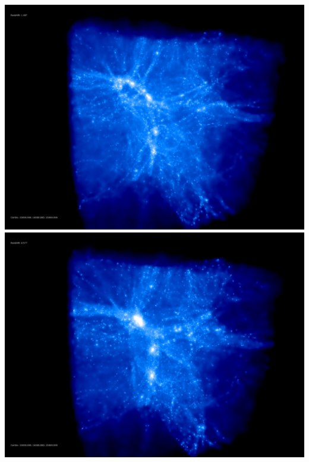\includegraphics[scale=0.1]{r256/stages_20/50.jpg} 
\includegraphics[scale=0.1]{r256/stages_20/100.jpg}  \\

